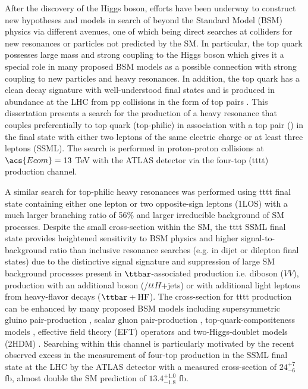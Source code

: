 \documentclass[../thesis.tex]{subfiles}
\begin{document}
After the discovery of the Higgs boson, efforts have been underway to construct new hypotheses and models in search of beyond the Standard Model (\acs{BSM}) physics via different avenues, one of which being direct searches at colliders for new resonances or particles not predicted by the \acs{SM}. In particular, the top quark possesses large mass and strong coupling to the Higgs boson \citep{theory:top_coupling} which gives it a special role in many proposed \acs{BSM} models as a possible connection with strong coupling to new particles and heavy resonances. In addition, the top quark has a clean decay signature with well-understood final states and is produced in abundance at the \acs{LHC} from \acs{pp} collisions in the form of top pairs \ttbar \citep{TOPQ-2018-39,Degrande_2011}. This dissertation presents a search for the production of a heavy resonance that couples preferentially to top quark (top-philic) in association with a top pair (\ttbar) in the final state with either two leptons of the same electric charge or at least three leptons (\acs{SSML}). The search is performed in proton-proton collisions at $\acs{Ecom}=13$ TeV with the \acs{ATLAS} detector \citep{atlas} via the four-top (\acs{tttt}) production channel.

A similar search for top-philic heavy resonances was performed using  \acs{tttt} final state containing either one lepton or two opposite-sign leptons (\acs{1LOS}) \citep{theory:ttZp_1los} with a much larger branching ratio of 56\% and larger irreducible background of \acs{SM} processes. Despite the small cross-section within the \acs{SM}, the \acs{tttt} \acs{SSML} final state provides heightened sensitivity to \acs{BSM} physics and higher signal-to-background ratio than inclusive resonance searches (e.g. in dijet or dilepton final states) due to the distinctive signal signature and suppression of large \acs{SM} background processes present in $\ttbar$-associated production i.e. diboson ($VV$), \ttbar production with an additional boson (\ttV/$ttH$+jets) or with additional light leptons from heavy-flavor decays ($\ttbar+\text{HF}$). The cross-section for \acs{tttt} production can be enhanced by many proposed \acs{BSM} models including supersymmetric gluino pair-production \citep{Nilles:1983ge,Farrar:1978xj}, scalar gluon pair-production \citep{Plehn_2009,Calvet_2013}, top-quark-compositeness models \citep{Pomarol_2008,Kumar_2009}, effective field theory (\acs{EFT}) operators \citep{Banelli_2021,Aoude_2022,Zhang_2018,Degrande_2011,Darm__2021} and two-Higgs-doublet models (\acs{2HDM}) \citep{Craig:2015jba,Craig_2017,Branco:2011iw,PhysRevD.93.075038,higgscomp}. Searching within this channel is particularly motivated by the recent observed excess in the measurement of four-top production in the \acs{SSML} final state at the \acs{LHC} by the \acs{ATLAS} detector \citep{tttt_obs} with a measured cross-section of $24^{+7}_{-6}$ fb, almost double the \acs{SM} prediction of $13.4^{+1.0}_{-1.8}$ fb.
\end{document}
